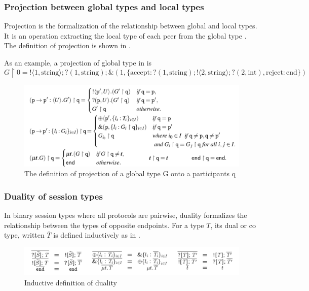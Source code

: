 \subsubsection{Projection between global types and local types} \label{b:mpst:proj}
Projection is the formalization of the relationship between global and local types. It is an operation extracting the local type of each peer from the global type \cite{coppoGentleIntroductionMultiparty2015}. The definition of projection is shown in .

As an example, a projection of global type in  is
$$
  G \upharpoonright 0 = !\langle 1, \text{string} \rangle;?(1, \text{string});\&(1, \{ \text{accept}: ?(1, \text{string});!\langle 2, \text{string} \rangle;?(2, \text{int}), 
  \text{reject}: \text{end} \})
$$  
\begin{figure}[H]
\includegraphics[width=\textwidth]{background/image/proj-def.png}
\caption{The definition of projection of a global type G onto a participants q\cite{coppoGentleIntroductionMultiparty2015}}
\label{b:mpst:pdef}
\end{figure}
\subsubsection{Duality of session types}
In binary session types where all protocols are pairwise, duality formalizes the relationship between the types of opposite endpoints. For a type $T$, its dual or co type, written $\bar{T}$ is defined inductively as in .
\begin{figure}[H]
\includegraphics[width=\textwidth]{background/image/dual-def.png}
\caption{Inductive definition of duality}
\label{b:mpst:dualdef}
\end{figure}

